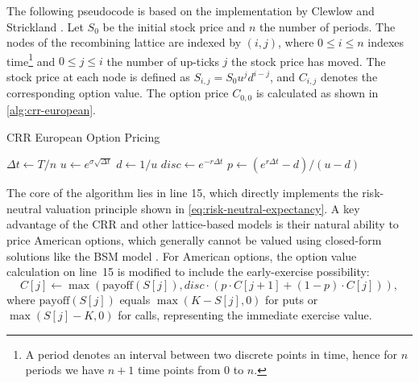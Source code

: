 \documentclass[english,12pt,a4paper,pdftex,sci,utf8]{aaltothesis}
\begin{document}
The following pseudocode is based on the implementation by Clewlow and Strickland \cite{clewlow1998implementing}. Let $S_0$ be the initial stock price and $n$ the number of periods. The nodes of the recombining lattice are indexed by $(i,j)$, where $0 \leq i \leq n$ indexes time\footnote{A period denotes an interval between two discrete points in time, hence for $n$ periods we have $n+1$ time points from $0$ to $n$.} and $0 \le j \le i$ the number of up-ticks $j$ the stock price has moved. The stock price at each node is defined as $S_{i,j} = S_0u^jd^{i-j}$, and $C_{i,j}$ denotes the corresponding option value. The option price  $C_{0,0}$ is calculated as shown in \cref{alg:crr-european}.

\begin{algorithm}
\LinesNumbered
\caption{CRR European Option Pricing}
\label{alg:crr-european}

$\Delta t \gets T/n$\;
$u \gets e^{\sigma\sqrt{\Delta t}}$\;
$d \gets 1/u$\;
$disc \gets e^{-r\Delta t}$\;
$p \gets (e^{r\Delta t} - d)/(u - d)$\;

\BlankLine
{}

\BlankLine
{}

\BlankLine
{}
 
\;
\end{algorithm}

The core of the algorithm lies in line 15, which directly implements the risk-neutral valuation principle shown in \cref{eq:risk-neutral-expectancy}. A key advantage of the CRR and other lattice-based models is their natural ability to price American options, which generally cannot be valued using closed-form solutions like the BSM model \cite{wilmott2013paul}. For American options, the option value calculation on line~15 is modified to include the early-exercise possibility:
\begin{equation*}
C[j] \gets \max(\text{payoff}(S[j]), disc \cdot (p \cdot C[j+1] + (1-p) \cdot C[j])),
\end{equation*}
where $\text{payoff}(S[j])$ equals $\max(K - S[j], 0)$ for puts or $\max(S[j] - K, 0)$ for calls, representing the immediate exercise value.
\end{document}
